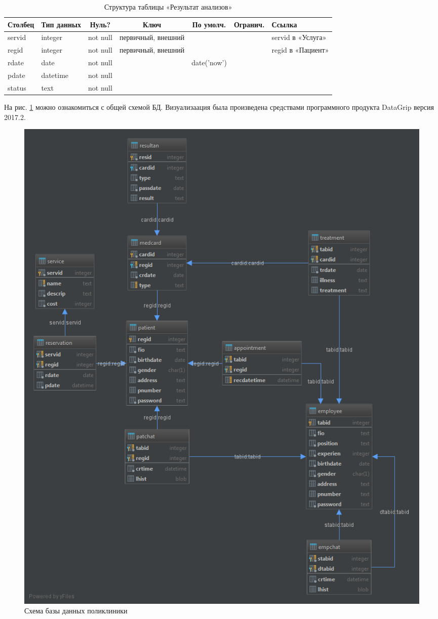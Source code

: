 \documentclass[14pt,a4paper,russian]{extreport}
\begin{document}
\begin{table}[h!]
    \caption{ } 
    \begin{subtable}[t]{\textwidth}
    \caption{Структура таблицы «Результат анализов»}
    \begin{tabularx}{\textwidth}{| X | X | c | c | c | c | X |}
        \hline
        \textbf{Столбец} & \textbf{Тип данных} & \textbf{Нуль?} & \textbf{Ключ} & \textbf{По
        умолч.} & \textbf{Огранич.} & \textbf{Ссылка} \\ \hline
        servid & integer & not null & первичный, внешний & & & servid в «Услуга»\\ \hline
        regid & integer & not null & первичный, внешний & & & regid в «Пациент» \\ \hline
        rdate & date & not null & & date('now') & & \\ \hline
        pdate & datetime & not null & & & & \\ \hline
        status & text & not null & & & & \\ \hline
    \end{tabularx}
    \end{subtable}
    \label{table:reserv}
\end{table}

\cleardoublepage
На рис. \ref{fig:clinic} можно ознакомиться с общей схемой БД. Визуализаация была
произведена средствами программного продукта DataGrip версия 2017.2.

\begin{figure}[b!]
        \includegraphics[scale=0.6]{clinic}
        \caption{Схема базы данных поликлиники}
        \label{fig:clinic}
\end{figure}
\end{document}
